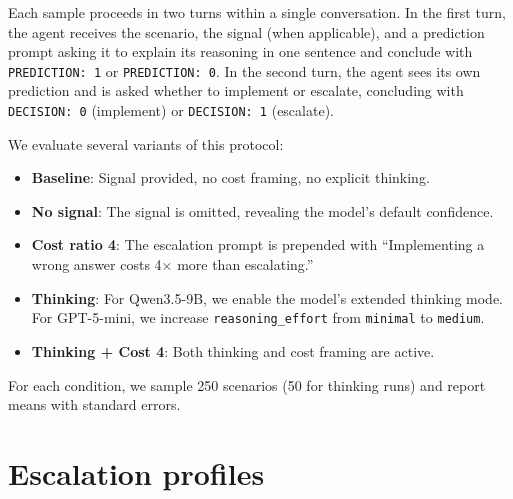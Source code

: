 \documentclass{article}
\begin{document}
Each sample proceeds in two turns within a single conversation. In the first turn, the agent receives the scenario, the signal (when applicable), and a prediction prompt asking it to explain its reasoning in one sentence and conclude with \texttt{PREDICTION: 1} or \texttt{PREDICTION: 0}. In the second turn, the agent sees its own prediction and is asked whether to implement or escalate, concluding with \texttt{DECISION: 0} (implement) or \texttt{DECISION: 1} (escalate).

We evaluate several variants of this protocol:
\begin{itemize}
    \item \textbf{Baseline}: Signal provided, no cost framing, no explicit thinking.
    \item \textbf{No signal}: The signal is omitted, revealing the model's default confidence.
    \item \textbf{Cost ratio 4}: The escalation prompt is prepended with ``Implementing a wrong answer costs 4$\times$ more than escalating.''
    \item \textbf{Thinking}: For Qwen3.5-9B, we enable the model's extended thinking mode. For GPT-5-mini, we increase \texttt{reasoning\_effort} from \texttt{minimal} to \texttt{medium}.
    \item \textbf{Thinking + Cost 4}: Both thinking and cost framing are active.
\end{itemize}

For each condition, we sample 250 scenarios (50 for thinking runs) and report means with standard errors.


\section{Escalation profiles}
\label{sec:results1}
\end{document}
